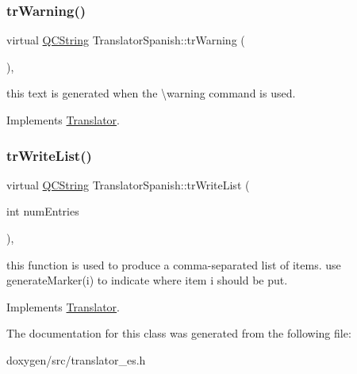 \subsubsection{\texorpdfstring{trWarning()}{trWarning()}}
{\footnotesize\ttfamily virtual \mbox{\hyperlink{class_q_c_string}{Q\+C\+String}} Translator\+Spanish\+::tr\+Warning (\begin{DoxyParamCaption}{ }\end{DoxyParamCaption})\hspace{0.3cm}{\ttfamily [inline]}, {\ttfamily [virtual]}}

this text is generated when the \textbackslash{}warning command is used. 

Implements \mbox{\hyperlink{class_translator}{Translator}}.

\mbox{\label{class_translator_spanish_a796c325a21a61fc35a1b63c34ab7a269}} 
\subsubsection{\texorpdfstring{trWriteList()}{trWriteList()}}
{\footnotesize\ttfamily virtual \mbox{\hyperlink{class_q_c_string}{Q\+C\+String}} Translator\+Spanish\+::tr\+Write\+List (\begin{DoxyParamCaption}\item[{int}]{num\+Entries }\end{DoxyParamCaption})\hspace{0.3cm}{\ttfamily [inline]}, {\ttfamily [virtual]}}

this function is used to produce a comma-\/separated list of items. use generate\+Marker(i) to indicate where item i should be put. 

Implements \mbox{\hyperlink{class_translator}{Translator}}.



The documentation for this class was generated from the following file\+:\begin{DoxyCompactItemize}
\item 
doxygen/src/translator\+\_\+es.\+h\end{DoxyCompactItemize}
